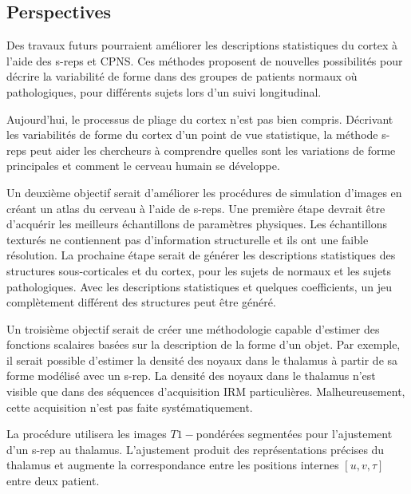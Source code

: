 \subsection{Perspectives}

Des travaux futurs pourraient améliorer les descriptions statistiques du cortex à l'aide des s-reps et CPNS.
Ces méthodes proposent de nouvelles possibilités pour décrire la variabilité de forme 
dans des groupes de patients normaux où pathologiques, pour différents sujets lors d'un suivi longitudinal.

Aujourd'hui, le processus de pliage du cortex n'est pas bien compris.
Décrivant les variabilités de forme du cortex d'un point de vue statistique, 
la méthode s-reps peut aider les chercheurs à comprendre 
quelles sont les variations de forme principales et comment le cerveau humain se développe.

Un deuxième objectif serait d'améliorer les procédures de simulation d'images 
en créant un atlas du cerveau à l'aide de s-reps.
Une première étape devrait être d'acquérir les meilleurs échantillons de paramètres physiques.
Les échantillons texturés ne contiennent pas d'information structurelle 
et ils ont une faible résolution.
La prochaine étape serait de générer les descriptions statistiques des 
structures sous-corticales et du cortex, pour les sujets de normaux et les sujets pathologiques.
Avec les descriptions statistiques et quelques coefficients, un jeu complètement différent des structures peut être généré.


Un troisième objectif serait de créer une méthodologie 
capable d'estimer des fonctions scalaires basées sur la description de la forme d'un objet.
Par exemple, il serait possible d'estimer la densité des noyaux dans le thalamus à partir de sa forme modélisé avec un s-rep.
La densité des noyaux dans le thalamus n'est visible que dans des séquences d'acquisition IRM particulières.
Malheureusement, cette acquisition n'est pas faite systématiquement.


La procédure utilisera les images $T1-$pondérées segmentées pour l'ajustement d'un s-rep au thalamus.
L'ajustement produit des représentations précises du thalamus et augmente la correspondance entre les positions 
internes $[u, v, \tau]$ entre deux patient.

